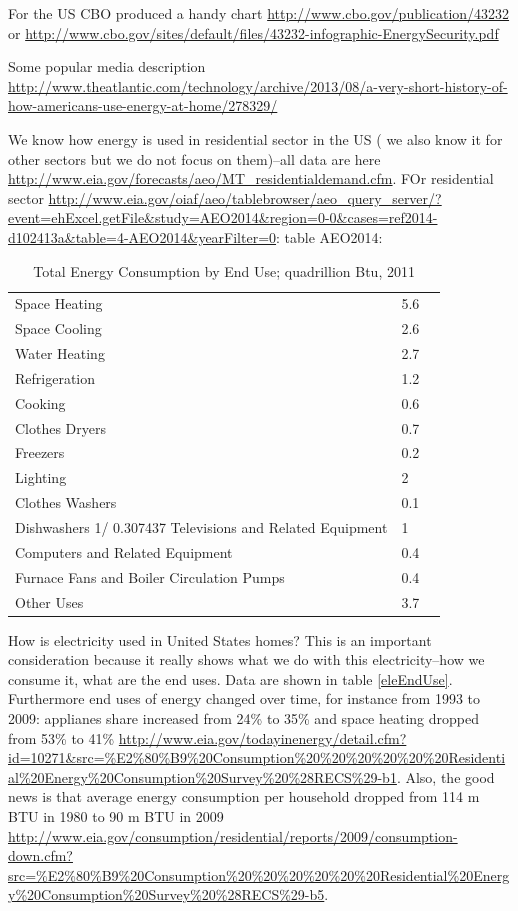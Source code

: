 \documentclass[10pt, letterpaper]{article}
\begin{document}
\begin{spacing}{1.4}
For the US CBO produced a handy chart \url{http://www.cbo.gov/publication/43232} or \url{http://www.cbo.gov/sites/default/files/43232-infographic-EnergySecurity.pdf}

Some popular media description
\url{http://www.theatlantic.com/technology/archive/2013/08/a-very-short-history-of-how-americans-use-energy-at-home/278329/}

We know how energy is used in residential sector in the US ( we also know it for
other sectors but we do not focus on them)--all data are here
\url{http://www.eia.gov/forecasts/aeo/MT_residentialdemand.cfm}. FOr residential
sector
\url{http://www.eia.gov/oiaf/aeo/tablebrowser/aeo_query_server/?event=ehExcel.getFile&study=AEO2014&region=0-0&cases=ref2014-d102413a&table=4-AEO2014&yearFilter=0}:
table AEO2014: 


\begin{table}[H]\centering\footnotesize
\caption{\label{freq_im_god} Total Energy Consumption by End Use; quadrillion
  Btu, 2011}
\begin{tabular}{lll}   \hline 
Space Heating&	5.6\\
Space Cooling&	2.6\\
Water Heating&	2.7\\
Refrigeration&	1.2\\
Cooking&	0.6\\
Clothes Dryers&	0.7\\
Freezers&	0.2\\
Lighting&	2\\
Clothes Washers&	0.1\\
Dishwashers 1/	0.307437
Televisions and Related Equipment&	1\\
Computers and Related Equipment &	0.4\\
Furnace Fans and Boiler Circulation Pumps&	0.4\\
Other Uses&	3.7\\\hline
\end{tabular}\end{table}

How is electricity used in United States homes? This is an important
consideration because it really shows what we do with this electricity--how we
consume it, what are the end uses. Data are shown in table
\ref{eleEndUse}. Furthermore end uses of energy changed over time, for instance
 from 1993 to 2009: applianes share increased from 24\% to 35\% and space
 heating dropped from 53\% to 41\%
 \url{http://www.eia.gov/todayinenergy/detail.cfm?id=10271&src=%E2%80%B9%20Consumption%20%20%20%20%20%20Residential%20Energy%20Consumption%20Survey%20%28RECS%29-b1}. 
Also, the good news is that average energy consumption per household dropped from 114 m BTU in 1980 to
90 m BTU in 2009 \url{http://www.eia.gov/consumption/residential/reports/2009/consumption-down.cfm?src=%E2%80%B9%20Consumption%20%20%20%20%20%20Residential%20Energy%20Consumption%20Survey%20%28RECS%29-b5}.  



\end{spacing}
\end{document}

